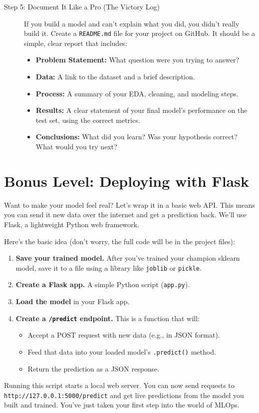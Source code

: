 \documentclass[11pt, letterpaper, openany]{book}
\begin{document}
\begin{description}
    \item[Step 5: Document It Like a Pro (The Victory Log)] If you build a model and can't explain what you did, you didn't really build it. Create a \texttt{README.md} file for your project on GitHub. It should be a simple, clear report that includes:
    \begin{itemize}
        \item \textbf{Problem Statement:} What question were you trying to answer?
        \item \textbf{Data:} A link to the dataset and a brief description.
        \item \textbf{Process:} A summary of your EDA, cleaning, and modeling steps.
        \item \textbf{Results:} A clear statement of your final model's performance on the test set, using the correct metrics.
        \item \textbf{Conclusions:} What did you learn? Was your hypothesis correct? What would you try next?
    \end{itemize}
\end{description}

\section{Bonus Level: Deploying with Flask}

Want to make your model feel real? Let's wrap it in a basic web API. This means you can send it new data over the internet and get a prediction back. We'll use Flask, a lightweight Python web framework.

Here's the basic idea (don't worry, the full code will be in the project files):
\begin{enumerate}
    \item \textbf{Save your trained model.} After you've trained your champion sklearn model, save it to a file using a library like \texttt{joblib} or \texttt{pickle}.
    \item \textbf{Create a Flask app.} A simple Python script (\texttt{app.py}).
    \item \textbf{Load the model} in your Flask app.
    \item \textbf{Create a \texttt{/predict} endpoint.} This is a function that will:
    \begin{itemize}
        \item Accept a POST request with new data (e.g., in JSON format).
        \item Feed that data into your loaded model's \texttt{.predict()} method.
        \item Return the prediction as a JSON response.
    \end{itemize}
\end{enumerate}
Running this script starts a local web server. You can now send requests to \texttt{http://127.0.0.1:5000/predict} and get live predictions from the model you built and trained. You've just taken your first step into the world of MLOps.
\end{document}
